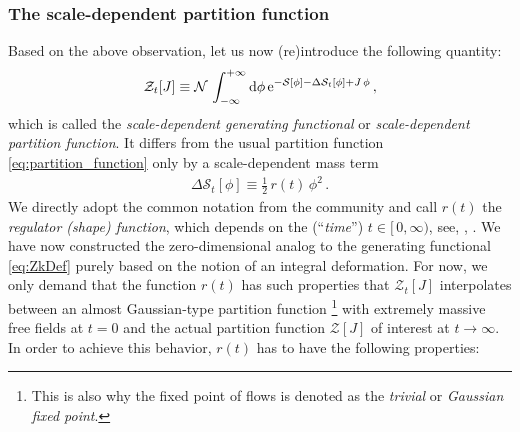 \subsubsection{The scale-dependent partition function}
Based on the above observation, let us now (re)introduce the following quantity:
\begin{align}
	\mathcal{Z}_t [ J ] \equiv \mathcal{N} \, \int_{-\infty}^{+\infty} \dif \phi \, \eu^{- \mathcal{S} [ \phi ] - \Delta \mathcal{S}_t [ \phi ] + J \, \phi } \, ,	\label{eq:scale_dependent_z}
\end{align}
which is called the \textit{scale-dependent generating functional} or \textit{scale-dependent partition function}.
It differs from the usual partition function \eqref{eq:partition_function} only by a scale-dependent mass term
\begin{align}
	\Delta \mathcal{S}_t [ \phi ] \equiv \tfrac{1}{2} \, r ( t ) \, \phi^2 \, .	\label{eq:regulator_insertion}
\end{align}
We directly adopt the common notation from the \frg{} community and call $r(t)$ the \textit{regulator (shape) function}, which depends on the \textit{\rgscale{}} (``\textit{time}'') $t \in [ \, 0 , \infty )$, see, \eg{}, .
We have now constructed the zero-dimensional analog to the \rgscaledependent{} generating functional \eqref{eq:ZkDef} purely based on the notion of an integral deformation.
For now, we only demand that the function $r(t)$ has such properties that $\mathcal{Z}_t [J]$ interpolates between an almost Gaussian-type partition function%
\footnote{%
	This is also why the \uv{} fixed point of \grg{} flows is denoted as the \textit{trivial} or \textit{Gaussian fixed point}.
}
with extremely massive free fields at $t = 0$ and the actual partition function $\mathcal{Z}[J]$ of interest at $t \rightarrow \infty$.
In order to achieve this behavior, $r ( t )$ has to have the following properties:
